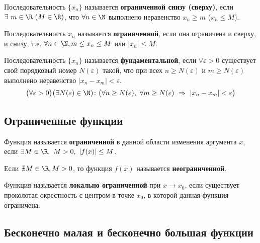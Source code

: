\begin{definition}
  Последовательность $\{x_{n}\} $ называется \textbf{ограниченной снизу (сверху)}, если $\exists\ m \in \R\ (M \in \R)$, что $\forall n \in \N$ выполнено неравенство $x_{n} \ge m$ ($x_{n} \le M$).
\end{definition}

\begin{definition}
  Последовательность $x_{n}$ называется \textbf{ограниченной}, если она ограничена и сверху, и снизу, т.е. $\forall n \in \N, m \le x_{n} \le M$ или $|x_{n}| \le M$.
\end{definition}

\begin{definition}
  Последовательность $\{x_{n}\} $ называется \textbf{фундаментальной}, если $\forall \varepsilon > 0$ существует свой порядковый номер $N(\varepsilon)$ такой, что при всех $n \ge N(\varepsilon)$ и $m \ge  N(\varepsilon)$ выполнено неравенство $|x_{n} - x_{m}| < \varepsilon$.
  \[
    \big(\forall \varepsilon > 0\big)\big(\exists N(\varepsilon) \in \N)\colon\big(\forall n \ge N(\varepsilon),\ \forall m \ge N(\varepsilon)\ \Rightarrow\ |x_{n} - x_{m}| < \varepsilon\big)
  \]
\end{definition}

\subsection{Ограниченные функции}

\begin{definition}
  Функция называется \textbf{ограниченной} в данной области изменения аргумента $x$, если $\exists M\in \R,\ M > 0,\ |f(x)| \le M$.
\end{definition}

\begin{definition}
Если $\nexists M \in \R, M > 0$, то функция $f(x)$ называется \textbf{неограниченной}.
\end{definition}

\begin{definition}
  Функция называется \textbf{локально ограниченной} при $x \to x_0$, если существует проколотая окрестность с центром в точке $x_0$, в которой данная функция ограничена.
\end{definition}

\subsection{Бесконечно малая и бесконечно большая функции}

